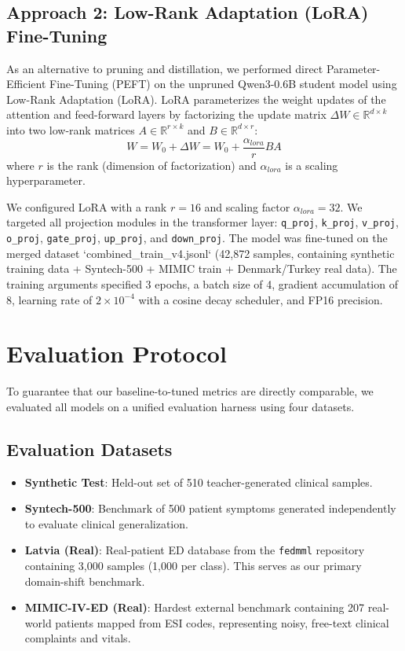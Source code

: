 \documentclass[a4paper, 12pt]{article}
\begin{document}
\subsection{Approach 2: Low-Rank Adaptation (LoRA) Fine-Tuning}
As an alternative to pruning and distillation, we performed direct Parameter-Efficient Fine-Tuning (PEFT) on the unpruned Qwen3-0.6B student model using Low-Rank Adaptation (LoRA). LoRA parameterizes the weight updates of the attention and feed-forward layers by factorizing the update matrix $\Delta W \in \mathbb{R}^{d \times k}$ into two low-rank matrices $A \in \mathbb{R}^{r \times k}$ and $B \in \mathbb{R}^{d \times r}$:
\begin{equation}
W = W_0 + \Delta W = W_0 + \frac{\alpha_{lora}}{r} B A
\end{equation}
where $r$ is the rank (dimension of factorization) and $\alpha_{lora}$ is a scaling hyperparameter.

We configured LoRA with a rank $r = 16$ and scaling factor $\alpha_{lora} = 32$. We targeted all projection modules in the transformer layer: \texttt{q\_proj}, \texttt{k\_proj}, \texttt{v\_proj}, \texttt{o\_proj}, \texttt{gate\_proj}, \texttt{up\_proj}, and \texttt{down\_proj}. The model was fine-tuned on the merged dataset `combined_train_v4.jsonl` (42,872 samples, containing synthetic training data + Syntech-500 + MIMIC train + Denmark/Turkey real data). The training arguments specified 3 epochs, a batch size of 4, gradient accumulation of 8, learning rate of $2\times 10^{-4}$ with a cosine decay scheduler, and FP16 precision.

\section{Evaluation Protocol}
\label{sec:evaluation}

To guarantee that our baseline-to-tuned metrics are directly comparable, we evaluated all models on a unified evaluation harness using four datasets.

\subsection{Evaluation Datasets}
\begin{itemize}
    \item \textbf{Synthetic Test}: Held-out set of 510 teacher-generated clinical samples.
    \item \textbf{Syntech-500}: Benchmark of 500 patient symptoms generated independently to evaluate clinical generalization.
    \item \textbf{Latvia (Real)}: Real-patient ED database from the \texttt{fedmml} repository containing 3,000 samples (1,000 per class). This serves as our primary domain-shift benchmark.
    \item \textbf{MIMIC-IV-ED (Real)}: Hardest external benchmark containing 207 real-world patients mapped from ESI codes, representing noisy, free-text clinical complaints and vitals.
\end{itemize}
\end{document}
